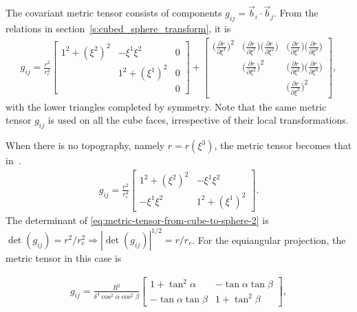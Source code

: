 \documentclass{report}
\begin{document}
The covariant metric tensor consists of components $g_{ij} = \vec{b}_i \cdot \vec{b}_j$. From the relations in section~\ref{s:cubed_sphere_transform}, it is 
\begin{align}\label{eq:metric-tensor-from-cube-to-sphere}
    g_{ij}  =
        \frac{r^2}{r_c^4}
     \left[ 
         \begin{array}{ccc}
              1^2 + (\xi^2)^2 & - \xi^1\xi^2 & 0\\
               & 1^2 + (\xi^1)^2 & 0\\
              && 0
         \end{array}
     \right]
    + \left[ 
        \begin{array}{ccc}
             \big(\frac{\partial r}{\partial \xi^1}\big)^2 
             & \big(\frac{\partial r}{\partial \xi^1}\big)\big(\frac{\partial r}{\partial \xi^2}\big) 
             & \big(\frac{\partial r}{\partial \xi^1}\big)\big(\frac{\partial r}{\partial \xi^3}\big) \\
             & \big(\frac{\partial r}{\partial \xi^2}\big)^2 
             & \big(\frac{\partial r}{\partial \xi^2}\big)\big(\frac{\partial r}{\partial \xi^3}\big) \\
             &
             &\big(\frac{\partial r}{\partial \xi^3}\big)^2
        \end{array}
    \right],
\end{align}
with the lower triangles completed by symmetry.
Note that the same metric tensor $g_{ij}$ is used on all the cube faces, irrespective of their local transformations.

When there is no topography, namely $r = r(\xi^3)$, the metric tensor becomes that in~\cite{Nair2005}.
\begin{align}\label{eq:metric-tensor-from-cube-to-sphere-2}
    g_{ij} =
    \frac{r^2}{r_c^4}
    \left[ 
        \begin{array}{cc}
             1^2 + (\xi^2)^2 & - \xi^1\xi^2 \\
             - \xi^1\xi^2    & 1^2 + (\xi^1)^2
        \end{array}
    \right].
\end{align}
The determinant of \eqref{eq:metric-tensor-from-cube-to-sphere-2} is $\det(g_{ij}) = r^2 / r^2_c \Rightarrow |\det(g_{ij})|^{1/2} = r / r_c$.
For the equiangular projection, the metric tensor in this case is

\begin{align}
    g_{ij} =
    \frac{R^2}{\delta^4 \cos^2 \alpha \cos^2 \beta}
    \left[ 
        \begin{array}{cc}
             1 + \tan^2 \alpha        & - \tan \alpha \tan \beta \\
             - \tan \alpha \tan \beta & 1 + \tan^2 \beta 
        \end{array}
    \right],
\end{align}
\end{document}
